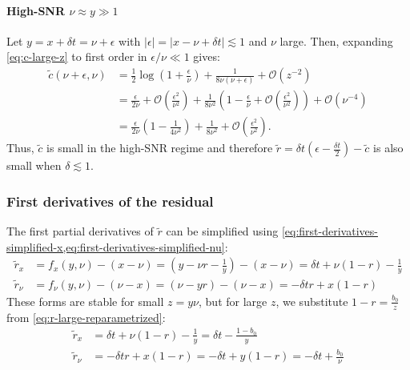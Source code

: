 \documentclass{article}
\begin{document}
\paragraph{High-SNR $\nu \approx y \gg 1$}

Let $y = x + \delta t = \nu + \epsilon$ with $|\epsilon| = |x - \nu + \delta t| \lesssim 1$ and $\nu$ large.
Then, expanding \cref{eq:c-large-z} to first order in $\epsilon/\nu \ll 1$ gives:
%
\begin{align}
  \tilde{c}(\nu+\epsilon, \nu) & = \frac{1}{2}\log\left(1 + \frac{\epsilon}{\nu}\right) + \frac{1}{8\nu(\nu+\epsilon)} + \mathcal{O}(z^{-2})                                                                                                   \\
                               & = \frac{\epsilon}{2\nu} + \mathcal{O}\left(\frac{\epsilon^2}{\nu^2}\right) + \frac{1}{8\nu^2}\left(1 - \frac{\epsilon}{\nu} + \mathcal{O}\left(\frac{\epsilon^2}{\nu^2}\right)\right) + \mathcal{O}(\nu^{-4}) \\
                               & = \frac{\epsilon}{2\nu}\left(1 - \frac{1}{4\nu^2}\right) + \frac{1}{8\nu^2} + \mathcal{O}\left(\frac{\epsilon^2}{\nu^2}\right).
\end{align}
%
Thus, $\tilde{c}$ is small in the high-SNR regime and therefore $\tilde{r} = \delta t (\epsilon - \frac{\delta t}{2}) - \tilde{c}$ is also small when $\delta \lesssim 1$.

\subsubsection{First derivatives of the residual}\label{sec:first-derivatives-residual}

The first partial derivatives of $\tilde{r}$ can be simplified using \cref{eq:first-derivatives-simplified-x,eq:first-derivatives-simplified-nu}:
%
\begin{align}
  \tilde{r}_x   & = f_x(y,\nu) - (x-\nu) = (y - \nu r - \frac{1}{y}) - (x-\nu) = \delta t + \nu (1 - r) - \frac{1}{y} \\
  \tilde{r}_\nu & = f_\nu(y,\nu) - (\nu-x) = (\nu - y r) - (\nu-x) = -\delta t r + x (1 - r)
\end{align}
%
These forms are stable for small $z = y \nu$, but for large $z$, we substitute $1-r = \frac{b_0}{z}$ from \cref{eq:r-large-reparametrized}:
%
\begin{align}
  \tilde{r}_x   & = \delta t + \nu (1 - r) - \frac{1}{y} = \delta t - \frac{1 - b_0}{y}           \\
  \tilde{r}_\nu & = -\delta t r + x (1 - r) = -\delta t + y (1 - r) = -\delta t + \frac{b_0}{\nu}
\end{align}
\end{document}
